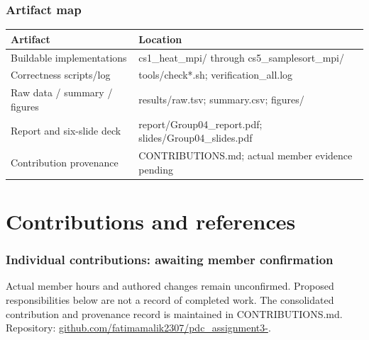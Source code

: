 \documentclass[11pt,a4paper]{article}
\begin{document}
\subsubsection*{Artifact map}

\begin{center}\small\setlength{\tabcolsep}{4pt}\renewcommand{\arraystretch}{1.12}

\begin{tabular}{@{}>{\raggedright\arraybackslash}p{}>{\raggedright\arraybackslash}p{}@{}}\toprule

\textbf{Artifact} & \textbf{Location}\\\midrule

Buildable implementations & cs1\_\allowbreak{}heat\_\allowbreak{}mpi/\allowbreak{} through cs5\_\allowbreak{}samplesort\_\allowbreak{}mpi/\allowbreak{}\\

Correctness scripts/\allowbreak{}log & tools/\allowbreak{}check*.sh; verification\_\allowbreak{}all.log\\

Raw data /\allowbreak{} summary /\allowbreak{} figures & results/\allowbreak{}raw.tsv; summary.csv; figures/\allowbreak{}\\

Report and six-slide deck & report/\allowbreak{}Group04\_\allowbreak{}report.pdf; slides/\allowbreak{}Group04\_\allowbreak{}slides.pdf\\

Contribution provenance & CONTRIBUTIONS.md; actual member evidence pending\\

\bottomrule\end{tabular}\end{center}

\FloatBarrier

\section{Contributions and references}

\subsubsection*{Individual contributions: awaiting member confirmation}

Actual member hours and authored changes remain unconfirmed. Proposed responsibilities below are not a record of completed work. The consolidated contribution and provenance record is maintained in CONTRIBUTIONS.md. Repository: \href{https://github.com/fatimamalik2307/pdc_assignment3-}{github.com/\allowbreak{}fatimamalik2307/\allowbreak{}pdc\_\allowbreak{}assignment3-}.
\end{document}
